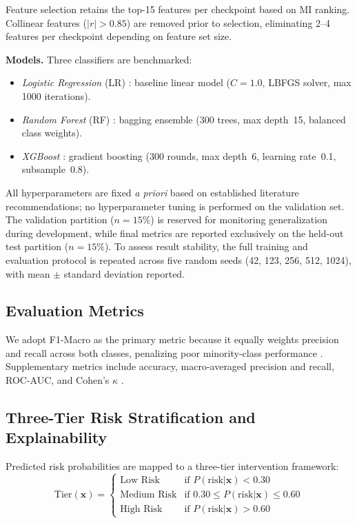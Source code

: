 \documentclass[conference,a4paper]{IEEEtran}
\begin{document}
Feature selection retains the top-15 features per checkpoint based on MI ranking. Collinear features ($|r| > 0.85$) are removed prior to selection, eliminating 2--4 features per checkpoint depending on feature set size.

\textbf{Models.} Three classifiers are benchmarked:
\begin{itemize}[leftmargin=*]
\item \textit{Logistic Regression} (LR) \cite{hosmer2013logistic}: baseline linear model ($C{=}1.0$, LBFGS solver, max 1000 iterations).
\item \textit{Random Forest} (RF) \cite{breiman2001rf}: bagging ensemble (300 trees, max depth~15, balanced class weights).
\item \textit{XGBoost} \cite{chen2016xgboost}: gradient boosting (300 rounds, max depth~6, learning rate~0.1, subsample~0.8).
\end{itemize}

All hyperparameters are fixed \textit{a priori} based on established literature recommendations; no hyperparameter tuning is performed on the validation set. The validation partition ($n = 15\%$) is reserved for monitoring generalization during development, while final metrics are reported exclusively on the held-out test partition ($n = 15\%$). To assess result stability, the full training and evaluation protocol is repeated across five random seeds (42, 123, 256, 512, 1024), with mean $\pm$ standard deviation reported.

\subsection{Evaluation Metrics}

We adopt F1-Macro as the primary metric because it equally weights precision and recall across both classes, penalizing poor minority-class performance \cite{sokolova2009metrics}. Supplementary metrics include accuracy, macro-averaged precision and recall, ROC-AUC, and Cohen's $\kappa$ \cite{cohen1960kappa}.

\subsection{Three-Tier Risk Stratification and Explainability}\label{sec:shap}

Predicted risk probabilities are mapped to a three-tier intervention framework:
\begin{equation}
\text{Tier}(\mathbf{x}) =
\begin{cases}
\text{Low Risk} & \text{if } P(\text{risk}|\mathbf{x}) < 0.30 \\
\text{Medium Risk} & \text{if } 0.30 \leq P(\text{risk}|\mathbf{x}) \leq 0.60 \\
\text{High Risk} & \text{if } P(\text{risk}|\mathbf{x}) > 0.60
\end{cases}
\label{eq:tier}
\end{equation}
\end{document}
